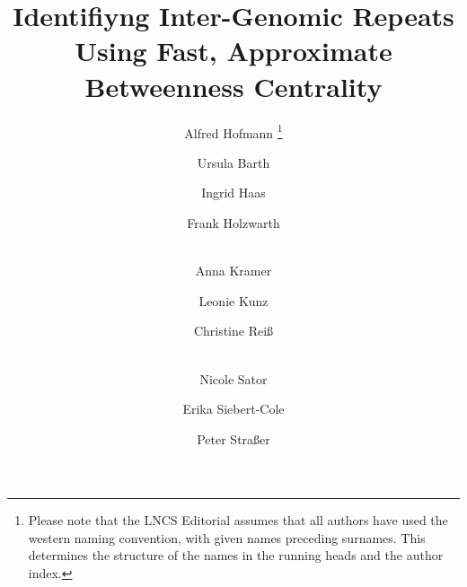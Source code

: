 \documentclass[runningheads,a4paper]{llncs}
\begin{document}
\mainmatter  %

\title{Identifiyng Inter-Genomic Repeats Using Fast, Approximate Betweenness Centrality}


%
%
\author{Alfred Hofmann%
\thanks{Please note that the LNCS Editorial assumes that all authors have used
the western naming convention, with given names preceding surnames. This determines
the structure of the names in the running heads and the author index.}%
\and Ursula Barth\and Ingrid Haas\and Frank Holzwarth\and\\
Anna Kramer\and Leonie Kunz\and Christine Rei\ss\and\\
Nicole Sator\and Erika Siebert-Cole\and Peter Stra\ss er}
%


%
%

\maketitle
\end{document}
